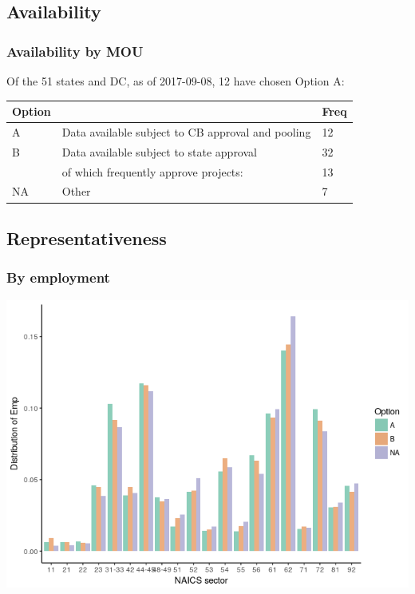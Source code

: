 \documentclass[aspectratio=169]{beamer}
\begin{document}
\subsection{Availability}

\begin{frame}
\frametitle{Availability by MOU}
Of the 51 states and DC, as of 2017-09-08, 12 have chosen Option A:
\begin{center}
	\begin{tabular}{lp{2in}l}
Option&&	Freq\\
\hline
A	&Data available subject to CB approval and pooling&12\\
B	&Data available subject to state approval &32\\
    & of which frequently approve projects: &13\\
NA	&Other &7\\
\end{tabular}
\end{center}
\end{frame}

\subsection{Representativeness}

\begin{frame}
	\frametitle{By employment}
	\centering
	\includegraphics[height=0.9\textheight]{graph_Emp-1.png}
\end{frame}
\end{document}
